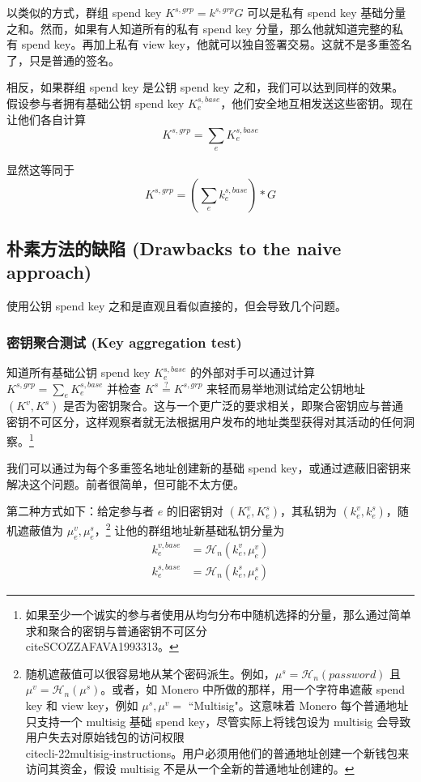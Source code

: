 以类似的方式，群组 spend key $K^{s,grp} = k^{s,grp} G$ 可以是私有 spend key 基础分量之和。然而，如果有人知道所有的私有 spend key 分量，那么他就知道完整的私有 spend key。再加上私有 view key，他就可以独自签署交易。这就不是多重签名了，只是普通的签名。

相反，如果群组 spend key 是公钥 spend key 之和，我们可以达到同样的效果。假设参与者拥有基础公钥 spend key $K^{s,base}_e$，他们安全地互相发送这些密钥。现在让他们各自计算
\[K^{s,grp} = \sum_e K^{s,base}_e\]

显然这等同于
\[K^{s,grp} = (\sum_e k^{s,base}_e)*G\]


\subsection{朴素方法的缺陷 (Drawbacks to the naive approach)}
\label{subsec:drawbacks-naive-aggregation-cancellation}

使用公钥 spend key 之和是直观且看似直接的，但会导致几个问题。

\subsubsection*{密钥聚合测试 (Key aggregation test)}
知道所有基础公钥 spend key $K^{s,base}_e$ 的外部对手可以通过计算 $K^{s,grp} = \sum_e K^{s,base}_e$ 并检查 $K^s \stackrel{?}{=} K^{s,grp}$ 来轻而易举地测试给定公钥地址 $(K^v,K^s)$ 是否为密钥聚合。这与一个更广泛的要求相关，即聚合密钥应与普通密钥不可区分，这样观察者就无法根据用户发布的地址类型获得对其活动的任何洞察。\footnote{如果至少一个诚实的参与者使用从均匀分布中随机选择的分量，那么通过简单求和聚合的密钥与普通密钥不可区分 \\cite{SCOZZAFAVA1993313}。}

我们可以通过为每个多重签名地址创建新的基础 spend key，或通过遮蔽旧密钥来解决这个问题。前者很简单，但可能不太方便。

第二种方式如下：给定参与者 $e$ 的旧密钥对 $(K^v_e,K^s_e)$，其私钥为 $(k^v_e,k^s_e)$，随机遮蔽值为 $\mu^v_e,\mu^s_e$，\footnote{随机遮蔽值可以很容易地从某个密码派生。例如，$\mu^s = \mathcal{H}_n(password)$ 且 $\mu^v = \mathcal{H}_n(\mu^s)$。或者，如 Monero 中所做的那样，用一个字符串遮蔽 spend key 和 view key，例如 $\mu^s,\mu^v =$ ``Multisig"。这意味着 Monero 每个普通地址只支持一个 multisig 基础 spend key，尽管实际上将钱包设为 multisig 会导致用户失去对原始钱包的访问权限 \\cite{cli-22multisig-instructions}。用户必须用他们的普通地址创建一个新钱包来访问其资金，假设 multisig 不是从一个全新的普通地址创建的。} 让他的群组地址新基础私钥分量为
\begin{align*}
    k^{v,base}_e &= \mathcal{H}_n(k^v_e,\mu^v_e)\\
    k^{s,base}_e &= \mathcal{H}_n(k^s_e,\mu^s_e)
\end{align*}

